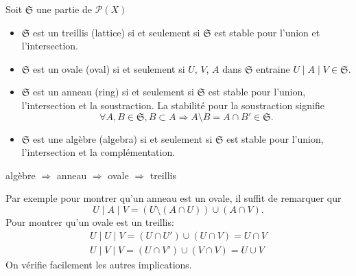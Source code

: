 \begin{defin}
  Soit $\mathfrak{S}$ une partie de $\mathcal{P}(X)$
  \begin{itemize}
    \item $\mathfrak{S}$ est un treillis (lattice) si et seulement si $\mathfrak{S}$ est stable pour l'union et l'intersection.
    \item $\mathfrak{S}$ est un ovale (oval) si et seulement si $U$, $V$, $A$ dans $\mathfrak{S}$ entraine $U \mid A \mid V \in \mathfrak{S}$.
    \item $\mathfrak{S}$ est un anneau (ring) si et seulement si $\mathfrak{S}$ est stable pour l'union, l'intersection et la soustraction. La stabilité pour la soustraction signifie
    \begin{displaymath}
      \forall A, B \in \mathfrak{S}, B \subset A \Rightarrow A \setminus B = A \cap B' \in \mathfrak{S}.
    \end{displaymath}  
    \item $\mathfrak{S}$ est une algèbre (algebra) si et seulement si $\mathfrak{S}$ est stable pour l'union, l'intersection et la complémentation. 
  \end{itemize}
\end{defin}

\begin{propn}\label{prop:ImpTypesSyst}
  algèbre $\Rightarrow$ anneau $\Rightarrow$ ovale $\Rightarrow$ treillis
\end{propn}
\begin{demo}
Par exemple pour montrer qu'un anneau est un ovale, il suffit de remarquer qur
\begin{displaymath}
  U \mid A \mid V = (U \setminus (A \cap U)) \cup (A \cap V).
\end{displaymath}
Pour montrer qu'un ovale est un treillis:
\begin{align*}
  U \mid U \mid V = (U \cap U') \cup (U \cap V) = U \cap V \\
  U \mid V \mid V = (U \cap V') \cup (V \cap V) = U \cup V
\end{align*}
On vérifie facilement les autres implications.
\end{demo}

